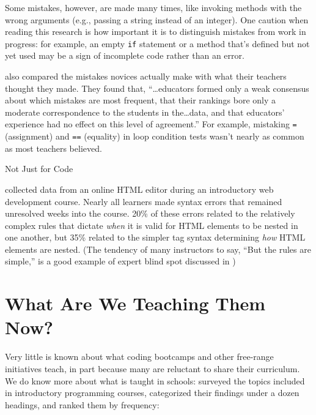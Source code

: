 Some mistakes, however, are made many times, like invoking methods
with the wrong arguments (e.g., passing a string instead of an
integer).  One caution when reading this research is how important it
is to distinguish mistakes from work in progress: for example, an
empty \texttt{if} statement or a method that's defined but not yet
used may be a sign of incomplete code rather than an error.

\cite{Brow2017} also compared the mistakes novices actually make with
what their teachers thought they made.  They found that,
``{\ldots}educators formed only a weak consensus about which mistakes
are most frequent, that their rankings bore only a moderate
correspondence to the students in the{\ldots}data, and that educators'
experience had no effect on this level of agreement.''  For example,
mistaking \texttt{=} (assignment) and \texttt{==} (equality) in loop
condition tests wasn't nearly as common as most teachers believed.

\begin{callout}{Not Just for Code}

  \cite{Park2015} collected data from an online HTML editor during an
  introductory web development course.  Nearly all learners made
  syntax errors that remained unresolved weeks into the course.  20\%
  of these errors related to the relatively complex rules that dictate
  \emph{when} it is valid for HTML elements to be nested in one
  another, but 35\% related to the simpler tag syntax determining
  \emph{how} HTML elements are nested.  (The tendency of many
  instructors to say, ``But the rules are simple,'' is a good example
  of expert blind spot discussed in )

\end{callout}

\section{What Are We Teaching Them Now?}\label{s:pck-now}

Very little is known about what coding bootcamps and other free-range
initiatives teach, in part because many are reluctant to share their
curriculum.  We do know more about what is taught in schools:
\cite{Luxt2017} surveyed the topics included in introductory
programming courses, categorized their findings under a dozen
headings, and ranked them by frequency:

